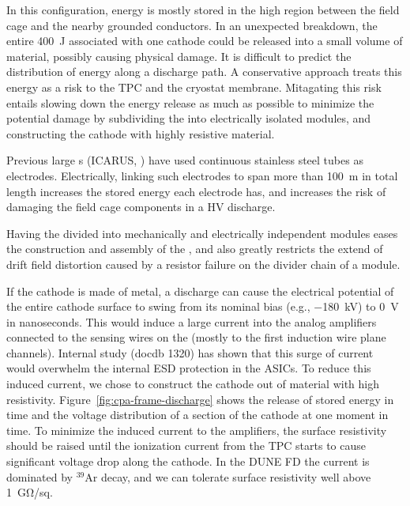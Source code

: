 In this configuration, energy is mostly stored in the high \efield{} region between the field cage and the nearby grounded conductors.  In an unexpected  breakdown, the entire \SI{400}{J} associated with one cathode could be released into a small volume of material, possibly causing physical damage.
It is difficult to predict the distribution of energy along a discharge path. A conservative approach treats this energy as a risk to the TPC and the cryostat membrane.  
Mitagating this risk entails slowing down the energy release as much as possible to minimize the potential damage by subdividing the  into electrically isolated modules, and constructing the cathode with highly resistive material.

Previous large \lartpc{}s (ICARUS, \microboone) have used continuous stainless steel tubes as electrodes. 
Electrically, linking such electrodes to span more than \SI{100}{\m} in total length increases the stored energy each electrode has, and increases the risk of damaging the field cage components in a HV discharge. 

Having the  divided into mechanically and electrically independent modules eases the construction and assembly of the , and also greatly restricts the extend of drift field distortion caused by a resistor failure on the divider chain of a  module.

If the cathode is made of metal, a  discharge can cause the electrical potential of the entire cathode surface to swing from its nominal bias (e.g., \SI{-180}{kV}) to \SI{0}{V} in nanoseconds. This would induce a large current into the analog  amplifiers connected to the sensing wires on the  (mostly to the first induction wire plane channels). Internal study (docdb 1320) has shown that this surge of current would overwhelm the internal ESD protection in the  ASICs.  To reduce this induced current, we chose to construct the cathode out of material with high resistivity.  Figure~\ref{fig:cpa-frame-discharge} shows the release of stored energy in time and the voltage distribution of a section of the cathode at one moment in time.  To minimize the induced current to the amplifiers, the surface resistivity should be raised until the ionization current from the TPC starts to cause significant voltage drop along the cathode.  In the DUNE FD the current is dominated by $^{39}$Ar decay, and we can tolerate surface resistivity well above \SI{1}{\giga\ohm/sq}. 


